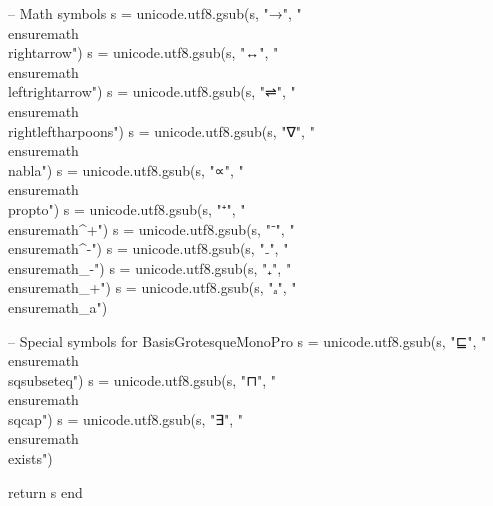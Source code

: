\begin{luacode*}
    -- Math symbols
    s = unicode.utf8.gsub(s, "→", "\\ensuremath{\\rightarrow}")
    s = unicode.utf8.gsub(s, "↔", "\\ensuremath{\\leftrightarrow}")
    s = unicode.utf8.gsub(s, "⇌", "\\ensuremath{\\rightleftharpoons}")
    s = unicode.utf8.gsub(s, "∇", "\\ensuremath{\\nabla}")
    s = unicode.utf8.gsub(s, "∝", "\\ensuremath{\\propto}")
    s = unicode.utf8.gsub(s, "⁺", "\\ensuremath{^{+}}")
    s = unicode.utf8.gsub(s, "⁻", "\\ensuremath{^{-}}")
    s = unicode.utf8.gsub(s, "₋", "\\ensuremath{_{-}}")
    s = unicode.utf8.gsub(s, "₊", "\\ensuremath{_{+}}")
    s = unicode.utf8.gsub(s, "ₐ", "\\ensuremath{_{a}}")
    
    -- Special symbols for BasisGrotesqueMonoPro
    s = unicode.utf8.gsub(s, "⊑", "\\ensuremath{\\sqsubseteq}")
    s = unicode.utf8.gsub(s, "⊓", "\\ensuremath{\\sqcap}")
    s = unicode.utf8.gsub(s, "∃", "\\ensuremath{\\exists}")
    
    return s
  end
  \end{luacode*}
  
  
\fi

\ifxetex
  \usepackage{unicode-math}
\fi

\usepackage{bbding}    %
\usepackage{pifont}    %
\usepackage{textcomp}  %


